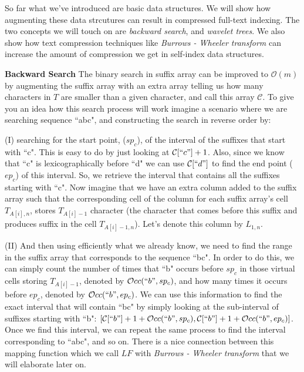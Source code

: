 \documentclass[11pt]{article}
\begin{document}
So far what we've introduced are basic data structures. We will show how augmenting these data strcutures can result in compressed full-text indexing. The two concepts we will touch on are \emph{backward search}, and \emph{wavelet trees}. We also show how text compression techniques like \emph{Burrows - Wheeler transform} can increase the amount of compression we get in self-index data structures. 

\textbf{Backward Search} The binary search in suffix array can be improved to $\mathcal{O}(m)$ by augmenting the suffix array with an extra array telling us how many characters in $T$ are smaller than a given character, and call this array $\mathcal{C}$. To give you an idea how this search process will work imagine a scenario where we are searching sequence ``abc", and constructing the search in reverse order by:

(I) searching for the start point, (\emph{$sp_c$}), of the interval of the suffixes that start with ``c". This is easy to do by just looking at $\mathcal{C}[``c"]+1$. Also, since we know that ``c" is lexicographically before ``d" we can use $\mathcal{C}[``d"]$ to find the end point (\emph{$ep_c$}) of this interval. So, we retrieve the interval that contains all the suffixes starting with ``c". Now imagine that we have an extra column added to the suffix array such that the corresponding cell of the column for each suffix array's cell $T_{A[i],n}$, stores $T_{A[i]-1}$ character (the character that comes before this suffix and produces suffix in the cell $T_{A[i]-1,n}$). Let's denote this column by $L_{1,n}$.   

(II) And then using efficiently what we already know, we need to find the range in the suffix array that corresponds to the sequence ``bc". In order to do this, we can simply count the number of times that ``b" occurs before \emph{$sp_c$} in those virtual cells storing $T_{A[i]-1}$, denoted by \emph{$\mathcal{O}cc(``b",sp_c)$}, and how many times it occurs before \emph{$ep_c$}, denoted by \emph{$\mathcal{O}cc(``b",ep_c)$}. We can use this information to find the exact interval that will contain ``bc" by simply looking at the sub-interval of suffixes starting with ``b": $[\mathcal{C}[``b"]+1+\mathcal{O}cc(``b",sp_c), \mathcal{C}[``b"]+1+\mathcal{O}cc(``b",ep_c)]$. Once we find this interval, we can repeat the same process to find the interval corresponding to ``abc", and so on. There is a nice connection between this mapping function which we call $LF$ with \emph{Burrows - Wheeler transform} that we will elaborate later on.
\end{document}
